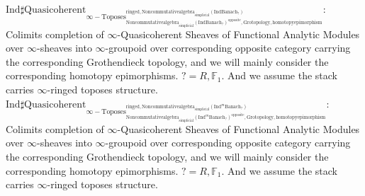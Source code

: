 \documentclass[11pt]{book}
\theoremstyle{definition}
\numberwithin{equation}{section}
\begin{document}
\noindent $\mathrm{Ind}\mathrm{\sharp Quasicoherent}_{\infty-\mathrm{Toposes}^{\mathrm{ringed},\mathrm{Noncommutativealgebra}_{\mathrm{simplicial}}(\mathrm{Ind}\mathrm{Banach}_?)}_{\mathrm{Noncommutativealgebra}_{\mathrm{simplicial}}(\mathrm{Ind}\mathrm{Banach}_?)^\mathrm{opposite},\mathrm{Grotopology,homotopyepimorphism}}}$: Colimits completion of $\infty$-Quasicoherent Sheaves of Functional Analytic Modules over $\infty$-sheaves into $\infty$-groupoid over corresponding opposite category carrying the corresponding Grothendieck topology, and we will mainly consider the corresponding homotopy epimorphisms. $?=R,\mathbb{F}_1$. And we assume the stack carries $\infty$-ringed toposes structure.\\
\noindent $\mathrm{Ind}\mathrm{\sharp Quasicoherent}_{\infty-\mathrm{Toposes}^{\mathrm{ringed},\mathrm{Noncommutativealgebra}_{\mathrm{simplicial}}(\mathrm{Ind}^m\mathrm{Banach}_?)}_{\mathrm{Noncommutativealgebra}_{\mathrm{simplicial}}(\mathrm{Ind}^m\mathrm{Banach}_?)^\mathrm{opposite},\mathrm{Grotopology,homotopyepimorphism}}}$: Colimits completion of $\infty$-Quasicoherent Sheaves of Functional Analytic Modules over $\infty$-sheaves into $\infty$-groupoid over corresponding opposite category carrying the corresponding Grothendieck topology, and we will mainly consider the corresponding homotopy epimorphisms. $?=R,\mathbb{F}_1$. And we assume the stack carries $\infty$-ringed toposes structure.\\ 
 
\end{document}
